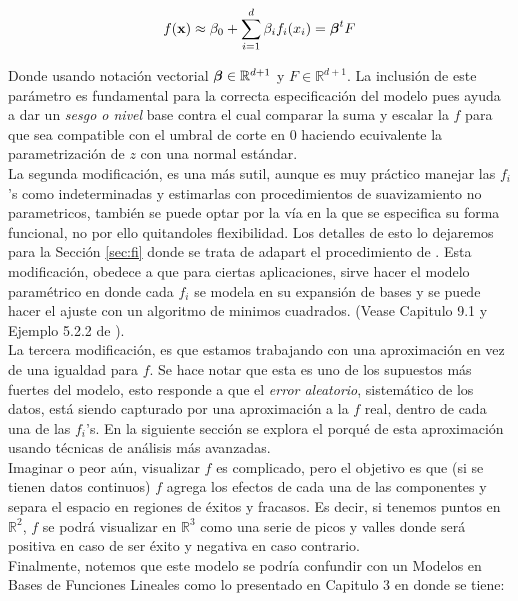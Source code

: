\documentclass[../Main/Main.tex]{subfiles}
\begin{document}
$$
f(\mathbf{x}) \approx \beta_0 +\sum_{i=1}^d \beta_i f_i(x_i) = \boldsymbol{\beta}^t F
$$

Donde usando notación vectorial $\boldsymbol{\beta}\in\mathbb{R}^{d+1}$ y $F \in\mathbb{R}^{d+1}$. La inclusión de este parámetro es fundamental para la correcta especificación del modelo pues ayuda a dar un \textit{sesgo o nivel} base contra el cual comparar la suma y escalar la $f$ para que sea compatible con el umbral de corte en $0$ haciendo ecuivalente la parametrización de $z$ con una normal estándar. \\

La segunda modificación, es una más sutil, aunque es muy práctico manejar las $f_i$'s como indeterminadas y estimarlas con procedimientos de suavizamiento no parametricos, también se puede optar por la vía en la que se especifica su forma funcional, no por ello quitandoles flexibilidad. Los detalles de esto lo dejaremos para la Sección \ref{sec:fi} donde se trata de adapart el procedimiento de \autocite{mallik1998automatic}. Esta modificación, obedece a que para ciertas aplicaciones, sirve hacer el modelo paramétrico en donde cada $f_i$ se modela en su expansión de bases y se puede hacer el ajuste con un algoritmo de minimos cuadrados. (Vease Capitulo 9.1 y Ejemplo 5.2.2 de \autocite{hastie2008elements}).\\

La tercera modificación, es que estamos trabajando con una aproximación en vez de una igualdad para $f$. Se hace notar que esta es uno de los supuestos más fuertes del modelo, esto responde a que el \textit{error aleatorio}, sistemático de los datos, está siendo capturado por una aproximación a la $f$ real, dentro de cada una de las $f_i$'s. En la siguiente sección se explora el porqué de esta aproximación usando técnicas de análisis más avanzadas.\\

Imaginar o peor aún, visualizar $f$ es complicado, pero el objetivo es que (si se tienen datos continuos) $f$ agrega los efectos de cada una de las componentes y separa el espacio en regiones de éxitos y fracasos. Es decir, si tenemos puntos en $\mathbb{R}^2$, $f$ se podrá visualizar en $\mathbb{R}^3$ como una serie de picos y valles donde será positiva en caso de ser éxito y negativa en caso contrario.\\

Finalmente, notemos que este modelo se podría confundir con un Modelos en Bases de Funciones Lineales como lo presentado en Capitulo 3 en \autocite{bishop2006pattern} donde se tiene:
\end{document}

